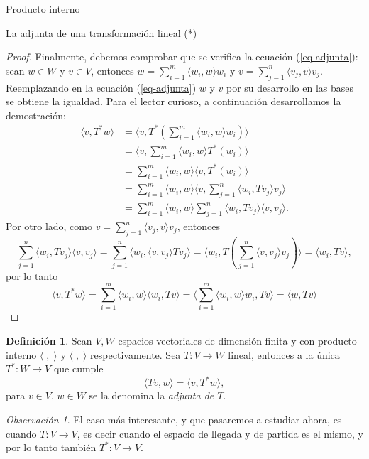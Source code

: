 \documentclass[a4paper,12pt,twoside,spanish,reqno]{amsbook}
\numberwithin{equation}{section}
\theoremstyle{definition}
\newtheorem{definicion}[teorema]{Definici\'on}
\theoremstyle{remark}
\newtheorem*{obs*}{Observaci\'on}
\newcommand{\la}{\langle}
\newcommand{\ra}{\rangle}
\begin{document}
\begin{chapter}{Producto interno}
\begin{section}{La adjunta de una transformación lineal (*)}
\begin{proof}
        Finalmente,  debemos comprobar que se verifica la ecuación (\ref{eq-adjunta}): sean  $w \in W$ y $v \in V$, entonces $w = \sum_{i=1}^{m} \la w_i,w\ra w_i$ y $v = \sum_{j=1}^{n} \la v_j,v\ra v_j$. Reemplazando en  la ecuación (\ref{eq-adjunta}) $w$ y $v$ por su desarrollo en las bases se obtiene la igualdad. Para el lector curioso, a continuación desarrollamos la demostración:
        \begin{align*}
            \la v,T^*w\ra &= 	\la v, T^*(\sum_{i=1}^{m} \la w_i,w\ra w_i) \ra\\
             &= \la v, \sum_{i=1}^{m} \la w_i,w\ra T^*(w_i) \ra\\
             &=	\sum_{i=1}^{m} \la w_i,w\ra\la v,  T^*(w_i) \ra\\
             &=\sum_{i=1}^{m} \la w_i,w\ra\la v,  \sum_{j=1}^{n} \la w_i,Tv_j\ra v_j\ra\\
             &=\sum_{i=1}^{m} \la w_i,w\ra \sum_{j=1}^{n} \la w_i,Tv_j\ra\la v,  v_j\ra.
        \end{align*}
        Por otro lado, como $v = \sum_{j=1}^{n} \la v_j,v\ra v_j$, entonces
        \begin{equation*}
            \sum_{j=1}^{n} \la w_i,Tv_j\ra\la v,  v_j\ra = \sum_{j=1}^{n} \la w_i,\la v,  v_j\ra Tv_j\ra = \la w_i, T (\sum_{j=1}^{n}\la v,  v_j\ra v_j)\ra = \la w_i, T v\ra, 
        \end{equation*}
        por lo tanto 
        \begin{equation*}
            \la v,T^*w\ra = \sum_{i=1}^{m} \la w_i,w\ra \la w_i, T v\ra =  \la\sum_{i=1}^{m} \la w_i,w\ra w_i, T v\ra = \la w, T v\ra
        \end{equation*}
        \end{proof}
        
        \begin{definicion}
            Sean $V, W$ espacios vectoriales de dimensión finita y con producto interno $\la \;,\;\ra$ y $\la \;,\;\ra$ respectivamente. Sea $T: V \to W$ lineal, entonces a la única $T^*: W \to V$ que cumple
            \begin{equation}\label{eq-adjunta}
            \la Tv,w\ra = \la v,T^*w\ra,
            \end{equation}  
            para $v\in V$, $w \in W$ se la denomina la \textit{adjunta de $T$}.
        \end{definicion}
        
        \begin{obs*} El caso más interesante, y que pasaremos a estudiar ahora, es cuando $T: V \to V$, es decir cuando el espacio de llegada y  de partida es el mismo, y por lo tanto también $T^*: V \to V$. 
        \end{obs*}
        

\end{section}
\end{chapter}
\end{document}
